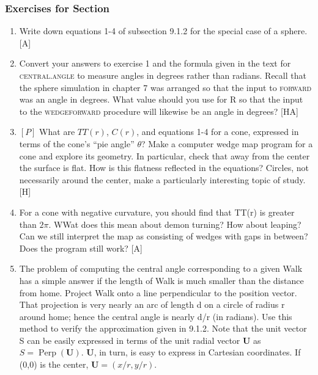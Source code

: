 \documentclass{book}
\begin{document}
\subsubsection{Exercises for Section \thesection}
\begin{enumerate}
\item Write down equations 1-4 of subsection 9.1.2 for the special case of
a sphere. [A]

\item Convert your answers to exercise 1 and the formula given in the text
for \textsc{central}\textsc{.angle} to measure angles in degrees rather than radians.
Recall that the sphere simulation in chapter 7 was arranged so that the
input to \textsc{forward} was an angle in degrees. What value should you use
for R so that the input to the \textsc{wedgeforward} procedure will likewise be
an angle in degrees? [HA]

\item $[P]$ What are $TT(r)$, $C(r)$, and equations 1-4 for a cone, expressed
in terms of the cone's ``pie angle'' $\theta$? Make a computer wedge map
program for a cone and explore its geometry. In particular, check that
away from the center the surface is flat. How is this flatness reflected
in the equations? Circles, not necessarily around the center, make a
particularly interesting topic of study. [H]

\item For a cone with negative curvature, you should find that TT(r) is
greater than $2 \pi$. WWat does this mean about demon turning? How
about leaping? Can we still interpret the map as consisting of wedges
with gaps in between? Does the program still work? [A]

\item The problem of computing the central angle corresponding to a given
Walk has a simple answer if the length of Walk is much smaller than
the distance from home. Project Walk onto a line perpendicular to the
position vector. That projection is very nearly an arc of length d on a
circle of radius r around home; hence the central angle is nearly d/r (in
radians). Use this method to verify the approximation given in 9.1.2.
Note that the unit vector S can be easily expressed in terms of the
unit radial vector \textbf{U} as $S = \operatorname{Perp}(\mathbf{U})$. \textbf{U}, in turn, is easy to express in Cartesian coordinates. If (0,0) is the center, $\mathbf{U} = (x/r, y/r)$.


\end{enumerate}
\end{document}
